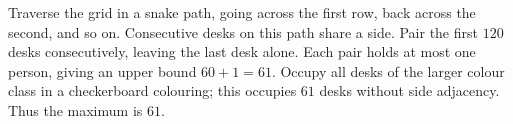 Traverse the grid in a snake path, going across the first row, back across the second, and so on. Consecutive desks on this path share a side. Pair the first $120$ desks consecutively, leaving the last desk alone. Each pair holds at most one person, giving an upper bound $60+1=61$. Occupy all desks of the larger colour class in a checkerboard colouring; this occupies $61$ desks without side adjacency. Thus the maximum is $\boxed{61}$.
